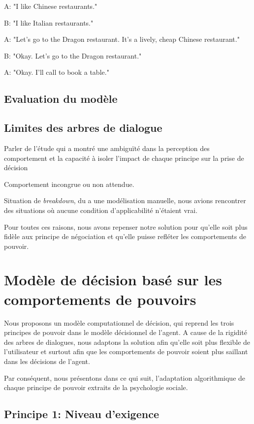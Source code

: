 		A: "I like Chinese restaurants."
		
		B: "I like Italian restaurants."
		
		A: "Let's go to the Dragon restaurant. It's a lively, cheap Chinese restaurant."
		
		B: "Okay. Let's go to the Dragon restaurant."
		
		A: "Okay. I'll call to book a table."
	
	
	\subsection{Evaluation du modèle}
	\subsection{Limites des arbres de dialogue}
		Parler de l'étude qui a montré une ambiguïté dans la perception des comportement et la capacité à isoler l'impact de chaque principe sur la prise de décision
		
		Comportement incongrue ou non attendue.
		
		Situation de \textit{breakdown}, du a une modélisation manuelle, nous avions rencontrer des situations où aucune condition d'applicabilité n'étaient vrai. 
		
		Pour toutes ces raisons, nous avons repenser notre solution pour qu'elle soit plus fidèle aux principe de négociation et qu'elle puisse refléter les comportements de pouvoir. 
	
	\section{Modèle de décision basé sur les comportements de pouvoirs}
	
		Nous proposons un modèle computationnel de décision, qui reprend les trois principes de pouvoir dans le modèle décisionnel de l'agent. 
		A cause de la rigidité des arbres de dialogues, nous adaptons la solution afin qu'elle soit plus flexible de l'utilisateur et surtout afin que les comportements de pouvoir soient plus saillant dans les décisions de l'agent.
		
		Par conséquent, nous présentons dans ce qui suit, l'adaptation algorithmique de chaque principe de pouvoir extraits de la psychologie sociale.
		
		\subsection{Principe 1: Niveau d'exigence}
		
